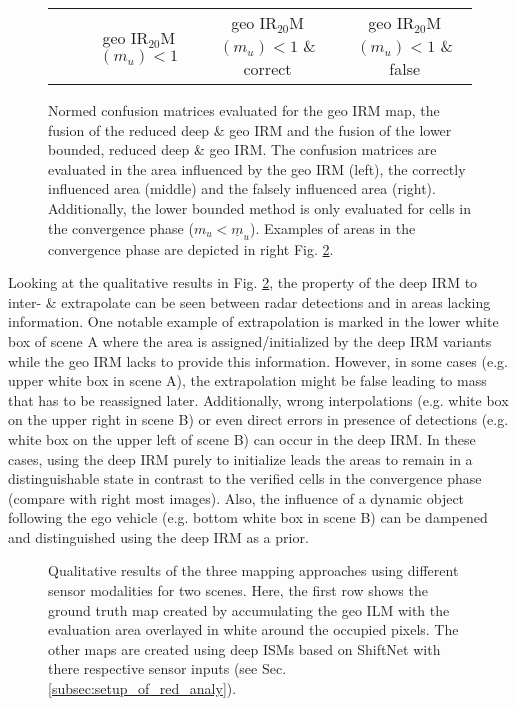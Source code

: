 \begin{figure}[H]
\begin{center}
{\begin{tabular}{c|c|ccc|ccc|ccc}
\hline
	& & \multicolumn{3}{c|}{\scriptsize{geo IR$_{20}$M$(m_u) < 1$}} & \multicolumn{3}{c|}{\scriptsize{geo IR$_{20}$M$(m_u) < 1$ \& correct}} & \multicolumn{3}{c}{\scriptsize{geo IR$_{20}$M$(m_u) < 1$ \& false}} 
\end{tabular}}
\caption{\label{fig:quant_analysis_of_prior}Normed confusion matrices evaluated for the geo IRM map, the fusion of the reduced deep \& geo IRM and the fusion of the lower bounded, reduced deep \& geo IRM. The confusion matrices are evaluated in the area influenced by the geo IRM (left), the correctly influenced area (middle) and the falsely influenced area (right). Additionally, the lower bounded method is only evaluated for cells in the convergence phase ($m_u < \underline{m}_u$). Examples of areas in the convergence phase are depicted in right Fig. \ref{fig:qual_analysis_of_prior}.}
\end{center}
\end{figure}
%
Looking at the qualitative results in Fig. \ref{fig:qual_analysis_of_prior}, the property of the deep IRM to inter- \& extrapolate can be seen between radar detections and in areas lacking information. One notable example of extrapolation is marked in the lower white box of scene A where the area is assigned/initialized by the deep IRM variants while the geo IRM lacks to provide this information. However, in some cases (e.g. upper white box in scene A), the extrapolation might be false leading to mass that has to be reassigned later. Additionally, wrong interpolations (e.g. white box on the upper right in scene B) or even direct errors in presence of detections (e.g. white box on the upper left of scene B) can occur in the deep IRM. In these cases, using the deep IRM purely to initialize leads the areas to remain in a distinguishable state in contrast to the verified cells in the convergence phase (compare with right most images). Also, the influence of a dynamic object following the ego vehicle (e.g. bottom white box in scene B) can be dampened and distinguished using the deep IRM as a prior.
%
\begin{figure}[H]
	\begin{center}
		\caption{\label{fig:qual_analysis_of_prior}Qualitative results of the three mapping approaches using different sensor modalities for two scenes. Here, the first row shows the ground truth map created by accumulating the geo ILM with the evaluation area overlayed in white around the occupied pixels. The other maps are created using deep ISMs based on ShiftNet with there respective sensor inputs (see Sec. \ref{subsec:setup_of_red_analy}).}
	\end{center}
\end{figure}
%

